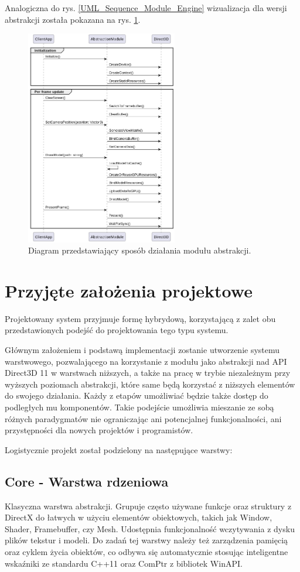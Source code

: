 Analogiczna do rys. \ref{UML_Sequence_Module_Engine} wizualizacja dla wersji abstrakcji została pokazana na rys. \ref{UML_Sequence_Module_Abstraction}.

\begin{figure}[ht!]
	\centering
	\includegraphics[width=250px]{uml/module_type_abstraction.png}
	\caption{Diagram przedstawiający sposób działania modułu abstrakcji.}
	\label{UML_Sequence_Module_Abstraction}
\end{figure}

\section{Przyjęte założenia projektowe}
Projektowany system przyjmuje formę hybrydową, korzystającą z zalet obu przedstawionych podejść do projektowania tego typu systemu. 

Głównym założeniem i podstawą implementacji zostanie utworzenie systemu warstwowego, pozwalającego na korzystanie z modułu jako abstrakcji nad API Direct3D 11 w warstwach niższych, a także na pracę w trybie niezależnym przy wyższych poziomach abstrakcji, które same będą korzystać z niższych elementów do swojego działania. Każdy z etapów umożliwiać będzie także dostęp do podległych mu komponentów. Takie podejście umożliwia mieszanie ze sobą różnych paradygmatów nie ograniczając ani potencjalnej funkcjonalności, ani przystępności dla nowych projektów i programistów.

Logistycznie projekt został podzielony na następujące warstwy:

\subsection{\textbf{Core} - Warstwa rdzeniowa}
Klasyczna warstwa abstrakcji. Grupuje często używane funkcje oraz struktury z DirectX do łatwych w użyciu elementów obiektowych, takich jak Window, Shader, Framebuffer, czy Mesh. Udostępnia funkcjonalność wczytywania z dysku plików tekstur i modeli. Do zadań tej warstwy należy też zarządzenia pamięcią oraz cyklem życia obiektów, co odbywa się automatycznie stosując inteligentne wskaźniki ze standardu C++11 oraz ComPtr z bibliotek WinAPI.

